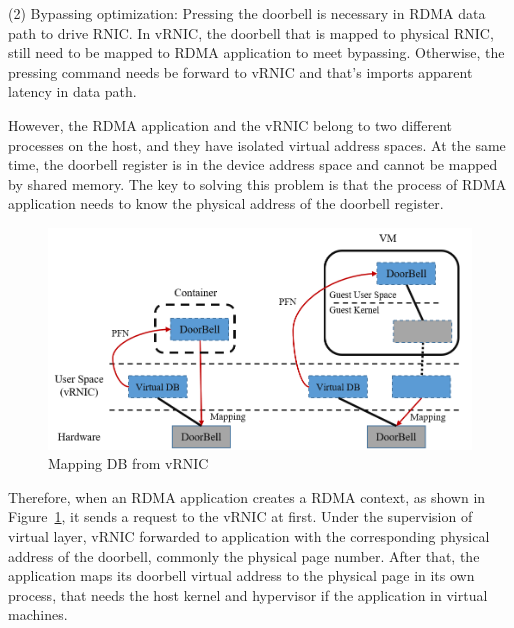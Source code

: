 (2) Bypassing optimization: Pressing the doorbell is necessary in RDMA data path to drive RNIC. In vRNIC, the doorbell that is mapped to physical RNIC, still need to be mapped to RDMA application to meet bypassing. Otherwise, the pressing command needs be forward to vRNIC and that’s imports apparent latency in data path.

However, the RDMA application and the vRNIC belong to two different processes on the host, and they have isolated virtual address spaces. At the same time, the doorbell register is in the device address space and cannot be mapped by shared memory. The key to solving this problem is that the process of RDMA application needs to know the physical address of the doorbell register.

\begin{figure}[!ht]
	\centering
	\includegraphics[width=1.0\linewidth]{images/by-pass}
	\caption{Mapping DB from vRNIC}
	\label{fig:by-pass}
\end{figure}

Therefore, when an RDMA application creates a RDMA context, as shown in Figure~\ref{fig:by-pass}, it sends a request to the vRNIC at first. Under the supervision of virtual layer, vRNIC forwarded to application with the corresponding physical address of the doorbell, commonly the physical page number. After that, the application maps its doorbell virtual address to the physical page in its own process, that needs the host kernel and hypervisor if the application in virtual machines.

